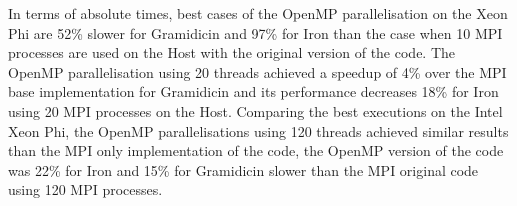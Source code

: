 \par{In terms of absolute times, best cases of the OpenMP parallelisation on the Xeon Phi are 52\% slower for Gramidicin and 97\% 
for Iron than the case when 10 MPI processes are  used on the Host with the original version of the code. The OpenMP 
parallelisation using 20 threads achieved a speedup of 4\% over the MPI base implementation for Gramidicin and its performance 
decreases 18\% for Iron using 20 MPI processes on the Host. Comparing the best executions on the Intel Xeon Phi, the OpenMP 
parallelisations using 120 threads achieved similar results than the MPI only implementation of the code, the OpenMP version 
of the code was 22\% for Iron and 15\% for Gramidicin slower than the MPI original code using 120 MPI processes.}





